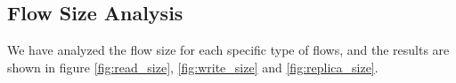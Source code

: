 \subsection{\bf Flow Size Analysis}
We have analyzed the flow size for each specific type of flows, and the results are shown in figure \ref{fig:read_size}, \ref{fig:write_size} and \ref{fig:replica_size}.




